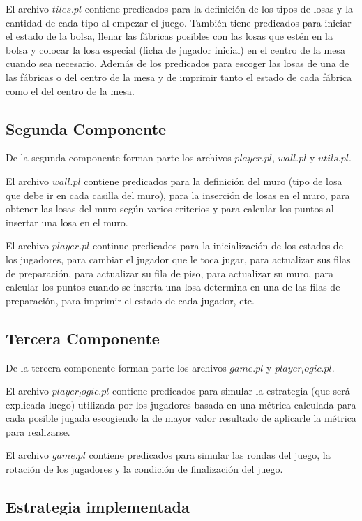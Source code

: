 \documentclass[11pt]{article}
\begin{document}
El archivo $tiles.pl$ contiene predicados para la definición de los tipos de losas y la cantidad de cada tipo al empezar el juego. También tiene predicados para iniciar el estado de la bolsa, llenar las fábricas posibles con las losas que estén en la bolsa y colocar la losa especial (ficha de jugador inicial) en el centro de la mesa cuando sea necesario. Además de los predicados para escoger las losas de una de las fábricas o del centro de la mesa y de imprimir tanto el estado de cada fábrica como el del centro de la mesa.

\subsection{Segunda Componente}

De la segunda componente forman parte los archivos $player.pl$, $wall.pl$ y $utils.pl$.

El archivo $wall.pl$ contiene predicados para la definición del muro (tipo de losa que debe ir en cada casilla del muro), para la inserción de losas en el muro, para obtener las losas del muro según varios criterios y para calcular los puntos al insertar una losa en el muro.

El archivo $player.pl$ continue predicados para la inicialización de los estados de los jugadores, para cambiar el jugador que le toca jugar, para actualizar sus filas de preparación, para actualizar su fila de piso, para actualizar su muro, para calcular los puntos cuando se inserta una losa determina en una de las filas de preparación, para imprimir el estado de cada jugador, etc.

\subsection{Tercera Componente}

De la tercera componente forman parte los archivos $game.pl$ y $player_logic.pl$.

El archivo $player_logic.pl$ contiene predicados para simular la estrategia (que será explicada luego) utilizada por los jugadores basada en una métrica calculada para cada posible jugada escogiendo la de mayor valor resultado de aplicarle la métrica para realizarse.

El archivo $game.pl$ contiene predicados para simular las rondas del juego, la rotación de los jugadores y la condición de finalización del juego.

\subsection{Estrategia implementada}
\end{document}
